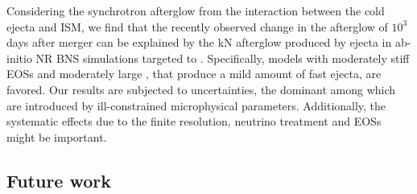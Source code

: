 Considering the synchrotron afterglow from the interaction between the cold  ejecta and 
\ac{ISM}, we find that the recently observed change in the afterglow of \GRB{} 
$10^3\,$days after merger can be explained by the \ac{kN} afterglow produced by ejecta in 
ab-initio \ac{NR} \ac{BNS} simulations targeted to \GW{}. 
%
Specifically, models with moderately stiff \acp{EOS} and moderately large \mr{}, 
that produce a mild amount of fast ejecta, are favored.
%
Our results are subjected to uncertainties, the dominant among which are introduced 
by ill-constrained microphysical parameters. 
Additionally, the systematic effects due to the finite resolution, neutrino treatment 
and \acp{EOS} might be important. 


\subsection{Future work}

